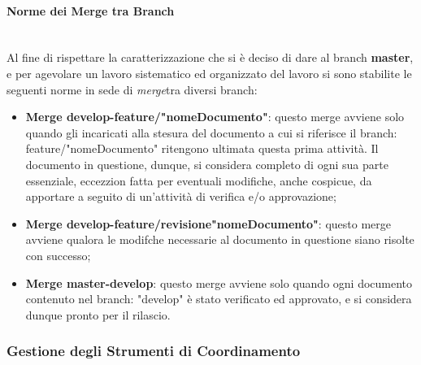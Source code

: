 \paragraph{Norme dei Merge tra Branch} ~\\
	Al fine di rispettare la caratterizzazione che si è deciso di dare al branch \textbf{master}, e per agevolare un lavoro sistematico ed organizzato del lavoro si sono stabilite le seguenti norme in sede di \textit{merge}\glossario tra diversi branch\glossario:
	\begin{itemize}
	\item \textbf{Merge develop-feature/"nomeDocumento"}: questo merge avviene solo quando gli incaricati alla stesura del documento a cui si riferisce il branch: feature/"nomeDocumento" ritengono ultimata questa prima attività. Il documento in questione, dunque, si considera completo di ogni sua parte essenziale, eccezzion fatta per eventuali modifiche, anche cospicue, da apportare a seguito di un'attività di verifica e/o approvazione;
	\item \textbf{Merge develop-feature/revisione"nomeDocumento"}: questo merge avviene qualora le modifche necessarie al documento in questione siano risolte con successo;
	\item \textbf{Merge master-develop}: questo merge avviene solo quando ogni documento contenuto nel branch: "develop" è stato verificato ed approvato, e si considera dunque pronto per il rilascio.
	\end{itemize}


\subsubsection{Gestione degli Strumenti di Coordinamento}

